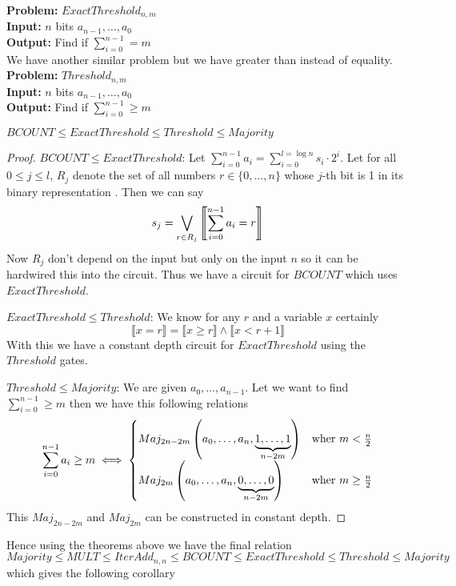 \textbf{Problem:} $ExactThreshold_{n,m}$\\
\textbf{Input:} $n$ bits $a_{n-1},\dots, a_0$\\
\textbf{Output:} Find if $\sum\limits_{i=0}^{n-1}= m$\\[2mm]
We have another similar problem but we have greater than instead of equality.\\[2mm]
\textbf{Problem:} $Threshold_{n,m}$\\
\textbf{Input:} $n$ bits $a_{n-1},\dots, a_0$\\
\textbf{Output:} Find if $\sum\limits_{i=0}^{n-1}\geq m$\\

\begin{theorem}\label{bcthmajrel}
	$BCOUNT\leq ExactThreshold\leq Threshold\leq Majority$
\end{theorem}

\begin{proof}
	{$BCOUNT\leq ExactThreshold$}: Let $\sum\limits_{i=0}^{n-1}a_i=\sum\limits_{i=0}^{l=\log n}s_i\cdot 2^i$. Let for all $0\leq j\leq l$, $R_j$ denote the set of all numbers $r\in \{0,\dots,n\}$ whose $j$-th bit is 1 in its binary representation . Then we can say $$s_j=\bigvee_{r\in R_j}\left\llbracket \sum\limits_{i=0}^{n-1}a_i=r\right\rrbracket$$Now $R_j$ don't depend on the input but only on the input $n$ so it can be hardwired this into the circuit. Thus we have a circuit for $BCOUNT$ which uses $ExactThreshold$.
	
	{$ExactThreshold\leq Threshold$}: We know for any $r$ and a variable $x$ certainly $$\llbracket x=r\rrbracket= \llbracket x\geq r\rrbracket \wedge  \llbracket x< r+1\rrbracket$$With this we have a constant depth circuit for $ExactThreshold$ using the $Threshold$ gates.
	
	{$Threshold\leq Majority$}: We are given $a_0,\dots,a_{n-1}$. Let we want to find $\sum\limits_{i=0}^{n-1}\geq m$ then we have this following relations $$\sum\limits_{i=0}^{n-1}a_i\geq m\iff \begin{cases}
		Maj_{2n-2m}\left(a_0,\dots, a_n,\underbrace{1,\dots,1}_{n-2m}\right) & \text{wher $m<\frac{n}{2}$}\\
		Maj_{2m}\left(a_0,\dots, a_n,\underbrace{0,\dots,0}_{n-2m}\right) & \text{wher $m\geq\frac{n}{2}$}
	\end{cases}$$
	This $Maj_{2n-2m}$ and $Maj_{2m}$ can be constructed in constant depth.
\end{proof}

\begin{remark}
	Hence using the theorems above we have the final relation $$Majority\leq MULT\leq IterAdd_{n,n}\leq BCOUNT\leq ExactThreshold\leq Threshold\leq Majority$$ which gives the following corollary
\end{remark}

